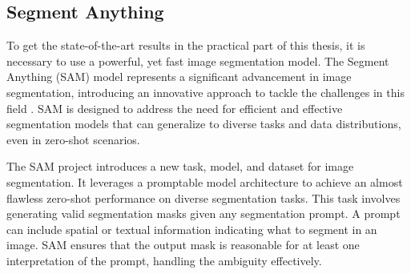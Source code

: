 


  \subsection{Segment Anything}
To get the state-of-the-art results in the practical part of this thesis, it is necessary to use a powerful, yet fast
image
segmentation model. The Segment Anything (SAM) model represents a significant advancement in image segmentation,
introducing an innovative approach to tackle the challenges in this field \cite{SAM2023}. SAM is designed to address
the need
for
efficient and effective segmentation models that can generalize to diverse tasks and data distributions, even in zero-shot scenarios.

The SAM project introduces a new task, model, and dataset for image segmentation. It leverages a promptable model
architecture to achieve an almost flawless zero-shot performance on diverse segmentation tasks. This task involves
generating valid segmentation masks given any segmentation prompt. A prompt can include spatial or textual
information indicating what to segment in an image. SAM ensures that the output mask is reasonable for at least one
interpretation of the prompt, handling the ambiguity effectively.

